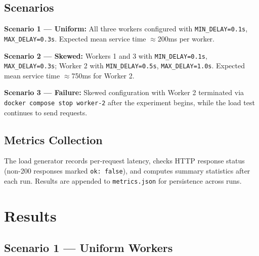\documentclass[conference]{IEEEtran}
\begin{document}
\subsection{Scenarios}

\textbf{Scenario 1 --- Uniform:} All three workers configured with \texttt{MIN\_DELAY=0.1s}, \texttt{MAX\_DELAY=0.3s}. Expected mean service time $\approx$200ms per worker.

\textbf{Scenario 2 --- Skewed:} Workers 1 and 3 with \texttt{MIN\_DELAY=0.1s}, \texttt{MAX\_DELAY=0.3s}; Worker 2 with \texttt{MIN\_DELAY=0.5s}, \texttt{MAX\_DELAY=1.0s}. Expected mean service time $\approx$750ms for Worker 2.

\textbf{Scenario 3 --- Failure:} Skewed configuration with Worker 2 terminated via \texttt{docker compose stop worker-2} after the experiment begins, while the load test continues to send requests.

\subsection{Metrics Collection}

The load generator records per-request latency, checks HTTP response status (non-200 responses marked \texttt{ok: false}), and computes summary statistics after each run. Results are appended to \texttt{metrics.json} for persistence across runs.

\section{Results}

\subsection{Scenario 1 --- Uniform Workers}
\end{document}
